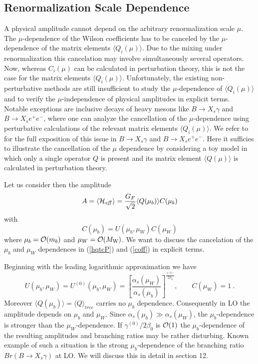 \documentclass[12pt]{article}
\def\as{\alpha_s}
\newcommand{\mw}{M_{\rm W}}
\newcommand{\be}{\begin{equation}}
\newcommand{\ee}{\end{equation}}
\newcommand{\ord}{{\cal O}}
\begin{document}
\begin{itemize}
\begin{itemize}
\subsection{Renormalization Scale Dependence}
A physical amplitude cannot depend on the arbitrary renormalization
scale $\mu$. The $\mu$-dependence of the Wilson coefficients has to
be canceled by the $\mu$-dependence of the matrix elements
$\langle Q_i(\mu)\rangle$. Due to the mixing under renormalization
this cancelation may involve simultaneously several operators.
Now, whereas $C_i(\mu)$ can be calculated in perturbation theory,
this is not the case for the matrix elements $\langle Q_i(\mu)\rangle$.
Unfortunately, the existing non-perturbative methods are still
insufficient to study the $\mu$-dependence of $\langle Q_i(\mu)\rangle$
and to verify the $\mu$-independence of physical amplitudes in explicit
terms. Notable exceptions are inclusive decays of heavy mesons
like $B\to X_s \gamma$ and $B \to X_s e^+e^-$, where one can analyze
the cancellation of the $\mu$-dependence using perturbative calculations
of the relevant matrix elements $\langle Q_i(\mu)\rangle$. We refer
to \cite{BuMu:94,BKP1} for the full exposition of this issue in
$B\to X_s \gamma$ and $B \to X_s e^+e^-$. Here it sufficies to illustrate
the cancellation of the $\mu$ dependence by considering a toy model
in which only a single operator $Q$ is present and its matrix element
$\langle Q(\mu)\rangle$ is calculated in perturbation theory.

Let us consider then the amplitude
\begin{equation}\label{hqtcP}
A=\langle {\cal H}_{\it eff}\rangle=
{G_F\over\sqrt{2}}
  \langle Q(\mu_b)\rangle C(\mu_b)   
\end{equation}
with
\be\label{coff}
C(\mu_b)=U(\mu_b,\mu_W) C(\mu_W)
\ee
where $\mu_b=\ord(m_b)$ and $\mu_W=\ord(\mw)$.
We want to discuss the cancelation of the $\mu_b$ and $\mu_W$ dependences
in (\ref{hqtcP}) and (\ref{coff}) in explicit terms.

Beginning with the leading logarithmic approximation we have
\begin{equation}\label{B9PP0}
U(\mu_b,\mu_W)=  U^{(0)}(\mu_b,\mu_W) =
\left[\frac{\as(\mu_W)}{\as(\mu_b)}\right]^{\frac{\gamma^{(0)}}{2\beta_0}}, 
\qquad C(\mu_W)=1~.
\end{equation}
Moreover $ \langle Q(\mu_b)\rangle=\langle Q \rangle_{tree} $ carries no
$\mu_b$ dependence.
Consequently in LO the amplitude depends on $\mu_b$ and $\mu_W$.
Since $\as(\mu_b)\gg\as(\mu_W)$, the $\mu_b$-dependence is stronger
than the $\mu_W$-dependence. 
If $\gamma^{(0)}/2\beta_0$ is $\ord(1)$
the $\mu_b$-dependence of the resulting amplitudes and branching ratios 
may be rather
disturbing. Known example of such a situation is the strong 
$\mu_b$-dependence
of the branching ratio $Br(B\to X_s\gamma)$ at LO.
We will discuss this in detail in section 12.


\end{itemize}
\end{itemize}
\end{document}
